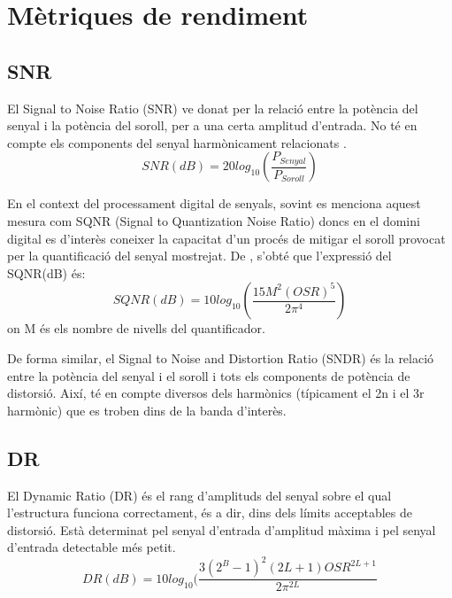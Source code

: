 \section{Mètriques de rendiment}

\subsection{SNR}
\par El Signal to Noise Ratio (SNR) ve donat per la relació entre la potència del senyal i la potència del soroll, per a una certa amplitud d'entrada. No té en compte els components del senyal harmònicament relacionats \cite{ADC16b}.
\begin{equation}\label{SNR_eq}
    SNR(dB) = 20log_{10}(\frac{P_{Senyal}}{P_{Soroll}})
\end{equation}
\par En el context del processament digital de senyals, sovint es menciona aquest mesura com SQNR (Signal to Quantization Noise Ratio) doncs en el domini digital es d'interès coneixer la capacitat d'un procés de mitigar el soroll provocat per la quantificació del senyal mostrejat. De \cite{UndrstndSDM}, s'obté que l'expressió del SQNR(dB) és:
\begin{equation}\label{eq_SQNR}
    SQNR(dB) = 10log_{10}(\frac{15 M^2 (OSR)^5}{2\pi^4})    
\end{equation}
on M és els nombre de nivells del quantificador.
\par De forma similar, el Signal to Noise and Distortion Ratio (SNDR) és la relació entre la potència del senyal i el soroll i tots els components de potència de distorsió. Així, té en compte diversos dels harmònics (típicament el 2n i el 3r harmònic) que es troben dins de la banda d'interès. \cite{SDMClassD}

\subsection{DR}
\par El Dynamic Ratio (DR) és el rang d'amplituds del senyal sobre el qual l'estructura funciona correctament, és a dir, dins dels límits acceptables de distorsió. Està determinat pel senyal d'entrada d'amplitud màxima i pel senyal d'entrada detectable més petit. \cite{ADC16b}
\begin{equation}
    DR(dB) = 10log_10(\frac{3(2^{B}-1)^{2}(2L+1)OSR^{2L +1}}{2\pi^{2L}}
\end{equation}

